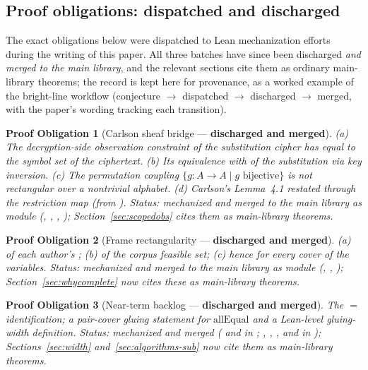 \documentclass[11pt]{article}
\newtheorem{obligation}{Proof Obligation}
\begin{document}
\subsection{Proof obligations: dispatched and discharged}

The exact obligations below were dispatched to Lean mechanization
efforts during the writing of this paper.  All three batches have
since been discharged \emph{and merged to the main library}, and the
relevant sections cite them as ordinary main-library theorems; the
record is kept here for provenance, as a worked example of the
bright-line workflow (conjecture $\to$ dispatched $\to$ discharged
$\to$ merged, with the paper's wording tracking each transition).

\begin{obligation}[Carlson sheaf bridge --- \textbf{discharged and
merged}]
\label{ob:carlson}
(a) The decryption-side observation constraint of the substitution
cipher has  equal to the symbol set of the
ciphertext.  (b) Its equivalence with  of the
substitution  via key inversion.  (c) The
permutation coupling $\{g : A \to A \mid g \text{ bijective}\}$ is
not rectangular over a nontrivial alphabet.  (d) Carlson's Lemma~4.1
restated through the restriction map (from
).  \emph{Status: mechanized and merged
to the main library as module 
(,
,
, );
Section~\ref{sec:scopedobs} cites them as main-library theorems.}
\end{obligation}

\begin{obligation}[Frame rectangularity --- \textbf{discharged and
merged}]
\label{ob:frame}
(a)  of each author's ; (b)
 of the corpus feasible set; (c) hence
 for every cover of the variables.
\emph{Status: mechanized and merged to the main library as module
 (,
,
); Section~\ref{sec:whycomplete} now
cites these as main-library theorems.}
\end{obligation}

\begin{obligation}[Near-term backlog --- \textbf{discharged and
merged}]
\label{ob:backlog}
The  $=$  identification; a
pair-cover gluing statement for $\mathrm{allEqual}$ and a Lean-level
gluing-width definition.  \emph{Status: mechanized and merged
( and
 in ;
, ,
, and
 in
); Sections~\ref{sec:width}
and~\ref{sec:algorithms-sub} now cite them as main-library
theorems.}
\end{obligation}
\end{document}
